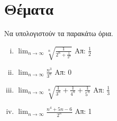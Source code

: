 \section{Θέματα}

Να υπολογιστούν τα παρακάτω όρια.

\begin{enumerate}[i)]
    \item $ \lim_{n \to \infty} \sqrt[n]{\frac{1}{2^{n}+ \frac{1}{3^{n}}} } $
        \hfill Απ: $ \frac{1}{2} $ 
    \item $ \lim_{n \to \infty} \frac{n^{3}}{3^{n}} $ \hfill Απ: $ 0 $
    \item $ \lim_{n \to \infty} \sqrt[n]{\frac{1}{3^{n}} + \frac{1}{4^{n}} 
        + \frac{1}{5^{n}}} $ \hfill Απ: $ \frac{1}{3} $
    \item $ \lim_{n \to \infty} \frac{n^{4}+5n-6}{2^{n}} $ \hfill Απ: 1 
\end{enumerate}


